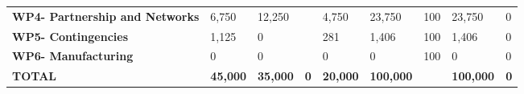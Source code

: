\begin{table}[H]
{\begin{tabular}{p{5cm}p{2cm}p{2cm}p{2.5cm}p{2cm}p{2cm}p{2cm}p{2cm}p{2cm}}
\textbf{WP4- Partnership and Networks} & 6,750                                                                  & 12,250                                                             &                                                                                 & 4,750                                                                        & 23,750                                                                                        & 100                        & 23,750                          & 0                                                                         \\
\textbf{WP5- Contingencies}                                                        & 1,125                                                                  & 0                                                                  &                                                                                 & 281                                                                          & 1,406                                                                                         & 100                        & 1,406                           & 0                                                                         \\
\textbf{WP6- Manufacturing}                                                        & 0                                                                      & 0                                                                  &                                                                                 & 0                                                                            & 0                                                                                             & 100                       & 0                               & 0                                                                         \\ \hline
\textbf{TOTAL}                                                                     & \textbf{45,000}                                                        & \textbf{35,000}                                                    & \textbf{0}                                                                      & \textbf{20,000}                                                              & \textbf{100,000}                                                                              & \textbf{}                    & \textbf{100,000}                & \textbf{0}                                                               
 \\ \bottomrule[2pt]
\end{tabular} }
\end{table}


